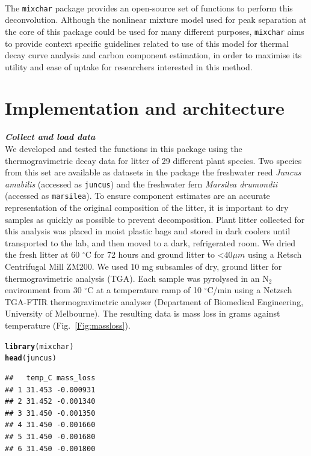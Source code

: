 \documentclass{jors}\usepackage[]{graphicx}\usepackage[]{color}
\makeatletter
\newcommand{\hlstd}[1]{\textcolor[rgb]{0.345,0.345,0.345}{#1}}%
\newcommand{\hlkwd}[1]{\textcolor[rgb]{0.737,0.353,0.396}{\textbf{#1}}}%
\newenvironment{kframe}{%
 \def\at@end@of@kframe{}%
 \ifinner\ifhmode%
  \def\at@end@of@kframe{\end{minipage}}%
  \begin{minipage}{\columnwidth}%
 \fi\fi%
 \def\FrameCommand##1{\hskip\@totalleftmargin \hskip-\fboxsep
 \colorbox{shadecolor}{##1}\hskip-\fboxsep
     \hskip-\linewidth \hskip-\@totalleftmargin \hskip\columnwidth}%
 \MakeFramed {\advance\hsize-\width
   \@totalleftmargin\z@ \linewidth\hsize
   \@setminipage}}%
 {\par\unskip\endMakeFramed%
 \at@end@of@kframe}
\newenvironment{knitrout}{}{} %
\makeatother
\begin{document}
\\
The \verb|mixchar| package provides an open-source set of functions to perform this deconvolution. Although the nonlinear mixture model used for peak separation at the core of this package could be used for many different purposes, \verb|mixchar| aims to provide context specific guidelines related to use of this model for thermal decay curve analysis and carbon component estimation, in order to maximise its utility and ease of uptake for researchers interested in this method.

\section*{Implementation and architecture}

\textbf{\textit{Collect and load data}}\\
We developed and tested the functions in this package using the thermogravimetric decay data for litter of 29 different plant species. Two species from this set are available as datasets in the package \textemdash the freshwater reed \textit{Juncus amabilis} (accessed as \verb|juncus|) and the freshwater fern \textit{Marsilea drumondii} (accessed as \verb|marsilea|). To ensure component estimates are an accurate representation of the original composition of the litter, it is important to dry samples as quickly as possible to prevent decomposition. Plant litter collected for this analysis was placed in moist plastic bags and stored in dark coolers until transported to the lab, and then moved to a dark, refrigerated room. We dried the fresh litter at 60 $^{\circ}$C for 72 hours and ground litter to \textless $40 \mu m$ using a Retsch Centrifugal Mill ZM200. We used 10 mg subsamles of dry, ground litter for thermogravimetric analysis (TGA). Each sample was pyrolysed in an N$_2$ environment from 30 $^{\circ}$C at a temperature ramp of 10 $^{\circ}$C/min using a Netzsch TGA-FTIR thermogravimetric analyser (Department of Biomedical Engineering, University of Melbourne). The resulting data is mass loss in grams against temperature (Fig.~\ref{Fig:massloss}).

\begin{knitrout}\footnotesize
{}\color{fgcolor}\begin{kframe}
\begin{alltt}
\hlkwd{library}\hlstd{(mixchar)}
\hlkwd{head}\hlstd{(juncus)}
\end{alltt}
\begin{verbatim}
##   temp_C mass_loss
## 1 31.453 -0.000931
## 2 31.452 -0.001340
## 3 31.450 -0.001350
## 4 31.450 -0.001660
## 5 31.450 -0.001680
## 6 31.450 -0.001800
\end{verbatim}
\end{kframe}
\end{knitrout}
\end{document}
